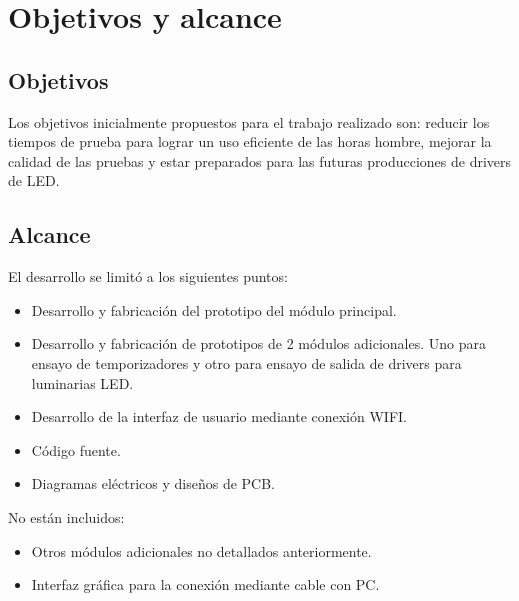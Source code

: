 \section{Objetivos y alcance}
\subsection{Objetivos}
Los objetivos inicialmente propuestos para el trabajo realizado son: reducir los tiempos de prueba para lograr un uso eficiente de las horas hombre, mejorar la calidad de las pruebas y estar preparados para las futuras producciones de drivers de LED.
\subsection{Alcance}
El desarrollo se limitó a los siguientes puntos:
\begin{itemize}
	\item Desarrollo y fabricación del prototipo del módulo principal.
	\item Desarrollo y fabricación de prototipos de 2 módulos adicionales. Uno para ensayo de 			temporizadores y otro para ensayo de salida de drivers para luminarias LED.
	\item Desarrollo de la interfaz de usuario mediante conexión WIFI.	
	\item Código fuente.
	\item Diagramas eléctricos y diseños de PCB.
\end{itemize}

No están incluidos:

\begin{itemize}
	\item Otros módulos adicionales no detallados anteriormente.
	\item Interfaz gráfica para la conexión mediante cable con PC.
\end{itemize}





